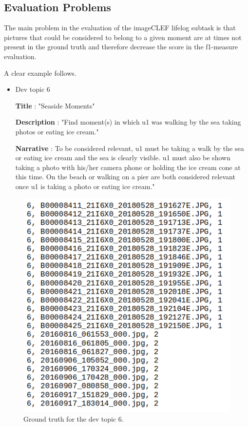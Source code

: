     \subsection{Evaluation Problems}

    The main problem in the evaluation of the imageCLEF lifelog subtask is that  pictures that could be considered to belong to a given moment are at times not present in the ground truth and therefore decrease the score in the f1-measure evaluation.

    A clear example follows.

    \begin{itemize}

        \item Dev topic 6
        

        \textbf{Title} : "Seaside Moments"

        \textbf{Description} : "Find moment(s) in which u1 was walking by the
        sea taking photos or eating ice cream."

        \textbf{Narrative} : To be considered relevant, u1 must be taking a
        walk by the sea or eating ice cream and the sea is clearly
        visible. u1 must also be shown taking a photo with his/her camera
        phone or holding the ice cream cone at this time. On the beach or
        walking on a pier are both considered relevant once u1 is taking a
        photo or eating ice cream."

        \end{itemize}

        \begin{figure}[htb]
            \centering
            \captionsetup{justification=centering}
            \includegraphics[width =  0.5 \textwidth]{Sections/5ImageClef/images/t6_gt.png}
            \caption{Ground truth for the dev topic 6.}  
           \label{fig:dataset_csv}
        \end{figure}
    
